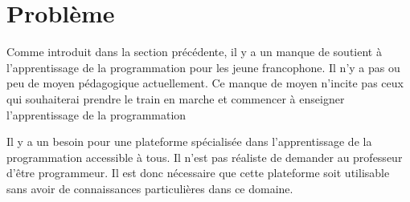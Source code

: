 \section{Problème}
\label{into-problem}
Comme introduit dans la section précédente, il y a un manque de soutient à l'apprentissage de la programmation pour les jeune francophone. Il n'y a pas ou peu de moyen pédagogique actuellement. Ce manque de moyen n'incite pas ceux qui souhaiterai prendre le train en marche et commencer à enseigner l'apprentissage de la programmation

Il y a un besoin pour une plateforme spécialisée dans l'apprentissage de la programmation accessible à tous. Il n'est pas réaliste de demander au professeur d'être programmeur. Il est donc nécessaire que cette plateforme soit utilisable sans avoir de connaissances particulières dans ce domaine.
